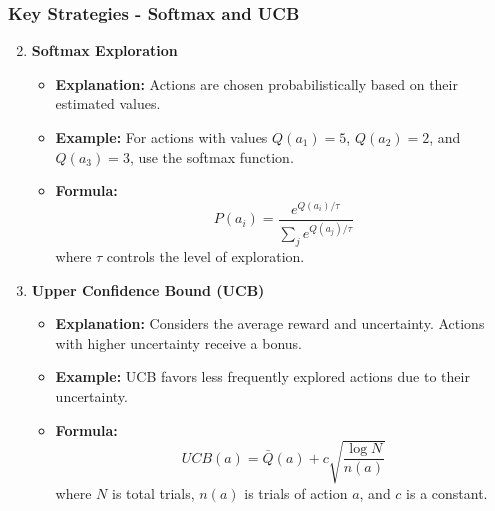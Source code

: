 \documentclass[aspectratio=169]{beamer}
\begin{document}
\begin{frame}[fragile]
    \frametitle{Key Strategies - Softmax and UCB}
    \begin{enumerate}
        \setcounter{enumi}{1}
        \item \textbf{Softmax Exploration}
        \begin{itemize}
            \item \textbf{Explanation:} Actions are chosen probabilistically based on their estimated values.
            \item \textbf{Example:} For actions with values $Q(a_1) = 5$, $Q(a_2) = 2$, and $Q(a_3) = 3$, use the softmax function.
            \item \textbf{Formula:}
            \begin{equation}
                P(a_i) = \frac{e^{Q(a_i)/\tau}}{\sum_{j} e^{Q(a_j)/\tau}}
            \end{equation}
            where $\tau$ controls the level of exploration.
        \end{itemize}

        \item \textbf{Upper Confidence Bound (UCB)}
        \begin{itemize}
            \item \textbf{Explanation:} Considers the average reward and uncertainty. Actions with higher uncertainty receive a bonus.
            \item \textbf{Example:} UCB favors less frequently explored actions due to their uncertainty.
            \item \textbf{Formula:}
            \begin{equation}
                UCB(a) = \bar{Q}(a) + c \sqrt{\frac{\log N}{n(a)}}
            \end{equation}
            where $N$ is total trials, $n(a)$ is trials of action $a$, and $c$ is a constant.
        \end{itemize}
    \end{enumerate}
\end{frame}
\end{document}
